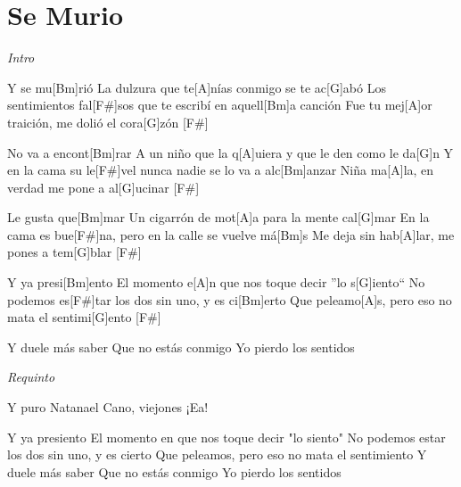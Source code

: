 \section{Se Murio}
\noindent

\vspace{1cm}

\begin{guitar}
	\begin{multicols}{2}
		\textit{Intro}
		\par

		Y se mu[Bm]rió
		La dulzura que te[A]nías conmigo se te ac[G]abó
		Los sentimientos fal[F#]sos que te escribí en aquell[Bm]a canción
		Fue tu mej[A]or traición, me dolió el cora[G]zón [F#] \par
		No va a encont[Bm]rar
		A un niño que la q[A]uiera y que le den como le da[G]n
		Y en la cama su le[F#]vel nunca nadie se lo va a alc[Bm]anzar
		Niña ma[A]la, en verdad me pone a al[G]ucinar [F#] \par
		Le gusta que[Bm]mar
		Un cigarrón de mot[A]a para la mente cal[G]mar
		En la cama es bue[F#]na, pero en la calle se vuelve má[Bm]s
		Me deja sin hab[A]lar, me pones a tem[G]blar [F#] \par
		Y ya presi[Bm]ento
		El momento e[A]n que nos toque decir ''lo s[G]iento``
		No podemos es[F#]tar los dos sin uno, y es ci[Bm]erto
		Que peleamo[A]s, pero eso no mata el sentimi[G]ento [F#] \par
		Y duele más saber
		Que no estás conmigo
		Yo pierdo los sentidos 
			\par 
			\textit{Requinto}
			\par
		Y puro Natanael Cano, viejones
		¡Ea! 
		\par
		Y ya presiento
		El momento en que nos toque decir "lo siento"
		No podemos estar los dos sin uno, y es cierto
		Que peleamos, pero eso no mata el sentimiento
		Y duele más saber
		Que no estás conmigo
		Yo pierdo los sentidos
	\end{multicols}
\end{guitar}
